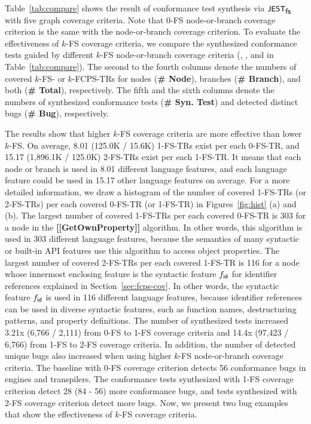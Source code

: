 
Table~\ref{tab:compare} shows the result of conformance test synthesis via
$\textsf{\small JEST}_{\textsf{\small fs}}$ with five graph coverage criteria.
%
Note that 0-FS node-or-branch coverage criterion is the same with the node-or-branch
coverage criterion.
%
To evaluate the effectiveness of $k$-FS coverage criteria, we compare the synthesized
conformance tests guided by different $k$-FS node-or-branch coverage criteria
(, , and  in Table~\ref{tab:compare}).
%
The second to the fourth columns denote the numbers of covered $k$-FS- or $k$-FCPS-TRs for
nodes (\textbf{\small \# Node}), branches (\textbf{\small \# Branch}), and both
(\textbf{\small \# Total}), respectively.
%
The fifth and the sixth columns denote the numbers of synthesized conformance tests
(\textbf{\small\# Syn. Test}) and detected distinct bugs
(\textbf{\small\# Bug}), respectively.


The results show that higher $k$-FS coverage criteria are more
effective than lower $k$-FS.
On average, 8.01 (125.0K / 15.6K) 1-FS-TRs exist per each 0-FS-TR, and 15.17 (1,896.1K
/ 125.0K) 2-FS-TRs exist per each 1-FS-TR.
%
It means that each node or branch is used in 8.01 different language features,
and each language feature could be used in 15.17 other language features on average.
%
For a more detailed information, we draw a histogram of the number of covered
1-FS-TRs (or 2-FS-TRs) per each covered 0-FS-TR (or 1-FS-TR) in
Figures~\ref{fig:hist} (a) and (b).
%
The largest number of covered 1-FS-TRs per each covered 0-FS-TR is 303
for a node in the \textbf{[[GetOwnProperty]]} algorithm.
%
In other words, this algorithm is used in 303 different language features,
because the semantics of many syntactic or built-in API features use
this algorithm to access object properties.
%
The largest number of covered 2-FS-TRs per each covered 1-FS-TR is 116
for a node whose innermost enclosing feature is the syntactic feature $f_{\textsf{id}}$
for identifier references explained in Section~\ref{sec:fcps-cov}.
%
In other words, the syntactic feature $f_{\textsf{id}}$ is used in 116 different
language features, because identifier references can be used in
diverse syntactic features, such as function names, destructuring
patterns, and property definitions.
%
The number of synthesized tests increased 3.21x (6,766 / 2,111) from 0-FS to
1-FS coverage criteria and 14.4x (97,423 / 6,766) from 1-FS to 2-FS coverage
criteria.
%
In addition, the number of detected unique bugs also increased when using higher
$k$-FS node-or-branch coverage criteria.
%
The baseline with 0-FS coverage criterion detects 56 conformance bugs in engines
and transpilers.
%
The conformance tests synthesized with 1-FS coverage criterion detect 28
(84 - 56) more conformance bugs, and tests synthesized with 2-FS coverage
criterion detect  more bugs.
%
Now, we present two bug examples that show the effectiveness of $k$-FS coverage
criteria.


